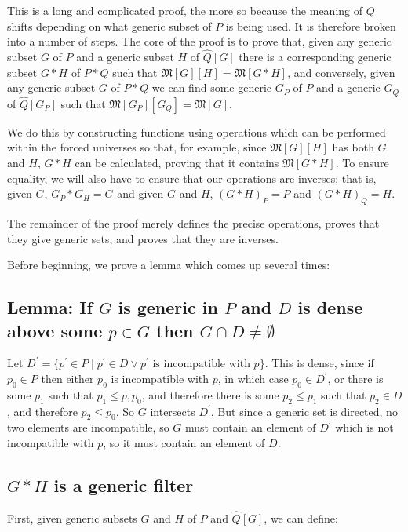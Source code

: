 \documentclass[12pt]{article}
\begin{document}
This is a long and complicated proof, the more so because the meaning of $Q$ shifts depending on what generic subset of $P$ is being used.  It is therefore broken into a number of steps.  The core of the proof is to prove that, given any generic subset $G$ of $P$ and a generic subset $H$ of $\hat{Q}[G]$ there is a corresponding generic subset $G*H$ of $P*Q$ such that $\mathfrak{M}[G][H]=\mathfrak{M}[G*H]$, and conversely, given any generic subset $G$ of $P*Q$ we can find some generic $G_P$ of $P$ and a generic $G_Q$ of $\hat{Q}[G_P]$ such that $\mathfrak{M}[G_P][G_Q]=\mathfrak{M}[G]$.

We do this by constructing functions using operations which can be performed within the forced universes so that, for example, since $\mathfrak{M}[G][H]$ has both $G$ and $H$, $G*H$ can be calculated, proving that it contains $\mathfrak{M}[G*H]$.  To ensure equality, we will also have to ensure that our operations are inverses; that is, given $G$, $G_P*G_H=G$ and given $G$ and $H$, $(G*H)_P=P$ and $(G*H)_Q=H$.

The remainder of the proof merely defines the precise operations, proves that they give generic sets, and proves that they are inverses.

Before beginning, we prove a lemma which comes up several times:

\subsection*{Lemma: If $G$ is generic in $P$ and $D$ is dense above some $p\in G$ then $G\cap D\neq\emptyset$}

Let $D^\prime=\{p^\prime\in P\mid p^\prime\in D \vee p^\prime\text{ is incompatible with }p\}$.  This is dense, since if $p_0\in P$ then either $p_0$ is incompatible with $p$, in which case $p_0\in D^\prime$, or there is some $p_1$ such that $p_1\leq p,p_0$, and therefore there is some $p_2\leq p_1$ such that $p_2\in D$, and therefore $p_2\leq p_0$.  So $G$ intersects $D^\prime$.  But since a generic set is directed, no two elements are incompatible, so $G$ must contain an element of $D^\prime$ which is not incompatible with $p$, so it must contain an element of $D$.

\subsection*{$G*H$ is a generic filter}

First, given generic subsets $G$ and $H$ of $P$ and $\hat{Q}[G]$, we can define:
\end{document}
